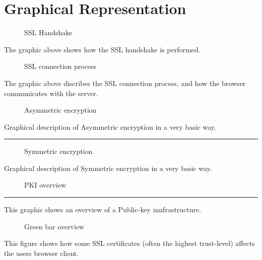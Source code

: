 \section{Graphical Representation}

\begin{figure}[H] %
\caption{SSL Handshake}
\label{fig:speciation}
\end{figure}

The graphic above shows how the SSL handshake is performed.

\begin{figure}[H] %
\caption{SSL connection process\cite{SSL_connection_process}}
\label{fig:speciation}
\end{figure}

The graphic above discribes the SSL connection process, and how the browser communicates with the server.

\begin{figure}[H] %
\caption{Asymmetric encryption\cite{Asymmetric_encryption}}
\label{fig:speciation}
\end{figure}

Graphical description of Asymmetric encryption in a very basic way.

\vspace{5mm}\hrule\vspace{5mm}

\begin{figure}[H] %
\caption{Symmetric encryption\cite{Symmetric_encryption}}
\label{fig:speciation}
\end{figure}

Graphical description of Symmetric encryption in a very basic way.

\begin{figure}[H] %
\caption{PKI overview\cite{pki_overview}}
\label{fig:speciation}
\end{figure}

\vspace{5mm}\hrule\vspace{5mm}

This graphic shows an overview of a Public-key innfrastructure.

\begin{figure}[H] %
\caption{Green bar overview\cite{green_bar}}
\label{fig:speciation}
\end{figure}

This figure shows how some SSL certificates (often the highest trust-level) affects the users browser client.